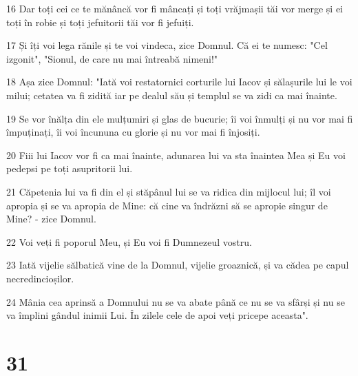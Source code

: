\par 16 Dar toți cei ce te mănâncă vor fi mâncați și toți vrăjmașii tăi vor merge și ei toți în robie și toți jefuitorii tăi vor fi jefuiți.
\par 17 Și îți voi lega rănile și te voi vindeca, zice Domnul. Că ei te numesc: "Cel izgonit", "Sionul, de care nu mai întreabă nimeni!"
\par 18 Așa zice Domnul: "Iată voi restatornici corturile lui Iacov și sălașurile lui le voi milui; cetatea va fi zidită iar pe dealul său și templul se va zidi ca mai înainte.
\par 19 Se vor înălța din ele mulțumiri și glas de bucurie; îi voi înmulți și nu vor mai fi împuținați, îi voi încununa cu glorie și nu vor mai fi înjosiți.
\par 20 Fiii lui Iacov vor fi ca mai înainte, adunarea lui va sta înaintea Mea și Eu voi pedepsi pe toți asupritorii lui.
\par 21 Căpetenia lui va fi din el și stăpânul lui se va ridica din mijlocul lui; îl voi apropia și se va apropia de Mine: că cine va îndrăzni să se apropie singur de Mine? - zice Domnul.
\par 22 Voi veți fi poporul Meu, și Eu voi fi Dumnezeul vostru.
\par 23 Iată vijelie sălbatică vine de la Domnul, vijelie groaznică, și va cădea pe capul necredincioșilor.
\par 24 Mânia cea aprinsă a Domnului nu se va abate până ce nu se va sfârși și nu se va împlini gândul inimii Lui. În zilele cele de apoi veți pricepe aceasta".

\chapter{31}


